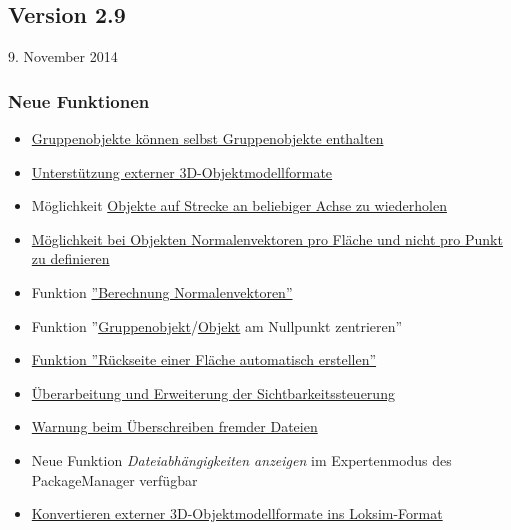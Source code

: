 \subsection{Version 2.9}\hfill 9. November 2014

\subsubsection{Neue Funktionen}
\begin{itemize}
\item \hyperref[sec:editor-obj-grp]{Gruppenobjekte können selbst Gruppenobjekte enthalten}
\item \hyperref[sec:editor-obj-externe]{Unterstützung externer 3D-Objektmodellformate}
\item Möglichkeit \hyperref[sec:editor-strecke-obj-achsewiederholung]{Objekte auf Strecke an beliebiger Achse zu wiederholen}
\item \hyperref[sec:editor-obj-l3dobj-normalen]{Möglichkeit bei Objekten Normalenvektoren pro Fläche und nicht pro Punkt zu definieren}
\item Funktion \hyperref[sec:editor-obj-l3dobj-normalen]{''Berechnung Normalenvektoren''}
\item Funktion ''\hyperref[sec:editor-obj-grp-verschieben]{Gruppenobjekt}/\hyperref[sec:editor-obj-l3dobj-punkteverschieben]{Objekt} am Nullpunkt zentrieren''
\item \hyperref[sec:editor-obj-l3dobj-flaeche]{Funktion ''Rückseite einer Fläche automatisch erstellen''}
\item \hyperref[sec:editor-obj-sichtbarkeitssteuerung]{Überarbeitung und Erweiterung der Sichtbarkeitssteuerung}
\item \hyperref[sec:editor-allg-dateienueberschreiben]{Warnung beim Überschreiben fremder Dateien}
\item Neue Funktion \emph{Dateiabhängigkeiten anzeigen} im Expertenmodus des PackageManager verfügbar
\item \hyperref[sec:editor-obj-externe-konvertieren]{Konvertieren externer 3D-Objektmodellformate ins Loksim-Format}
\end{itemize}


